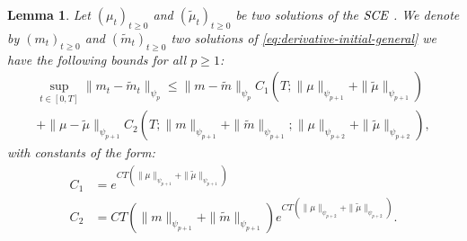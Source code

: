 \documentclass[11pt,a4paper]{article}
\newcommand{\SCE}{\emph{SCE}}
\newcommand{\Proc}[1]{\left(#1\right)_{t\geq 0}}
\newtheorem{lemma}[theorem]{Lemma}
\begin{document}
\begin{lemma}\label{lem:pseudo-lip-derivative-eq}
     Let $\Proc{\mu_t}$ and $\Proc{\tilde{\mu}_t}$ be two solutions of the $\SCE$ . We denote by $\Proc{m_t}$ and $\Proc{\tilde{m}_t}$ two solutions of \eqref{eq:derivative-initial-general} we have the following bounds for all $p \geq 1$:
    \begin{multline*}
        \sup\limits_{t \in [0,T]} \| m_t - \tilde{m}_t \|_{\psi_p} \leq \|m- \tilde{m} \|_{\psi_{p}} C_1\left(T;\| \mu\|_{\psi_{p+1}} + \| \tilde{\mu}\|_{\psi_{p+1}}\right)\\
        + \|\mu - \tilde{\mu} \|_{\psi_{p+1}}C_2\left(T; \|m\|_{\psi_{p+1}}+ \|\tilde{m}\|_{\psi_{p+1}};\|\mu\|_{\psi_{p +2}} + \|\tilde{\mu}\|_{\psi_{p +2}}\right),
    \end{multline*}
    with constants of the form:
    \begin{align*}
        C_1 &= e^{CT\left(\| \mu\|_{\psi_{p+1}} + \|\tilde{ \mu}\|_{\psi_{p+1}}\right)}\\
        C_2 &= CT(\|m\|_{\psi_{p+1}}+ \|\tilde{m}\|_{\psi_{p+1}})e^{CT\left(\| \mu\|_{\psi_{p+2}} + \|\tilde{ \mu}\|_{\psi_{p+2}}\right)}.
    \end{align*}
\end{lemma}
\end{document}
